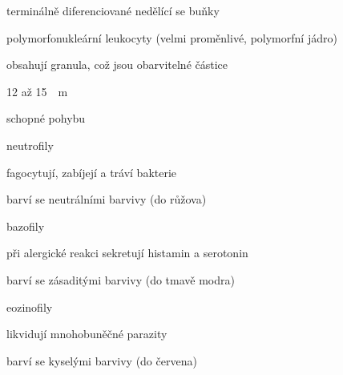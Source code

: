 \documentclass[DIV=8]{scrreprt}
\begin{document}
\begin{myItemize}[nosep]
    \item terminálně diferenciované nedělící se buňky
    \item polymorfonukleární leukocyty (velmi proměnlivé, polymorfní jádro)
    \item obsahují granula, což jsou obarvitelné částice
    \item \si{12} až \si{15 \mu m}
    \item schopné pohybu
    \item neutrofily
\begin{myItemize}[nosep]
    \item fagocytují, zabíjejí a tráví bakterie
    \item barví se neutrálními barvivy (do růžova)
\end{myItemize}

    \item bazofily
\begin{myItemize}[nosep]
    \item při alergické reakci sekretují histamin a serotonin
    \item barví se zásaditými barvivy (do tmavě modra)
\end{myItemize}

    \item eozinofily
\begin{myItemize}[nosep]
    \item likvidují mnohobuněčné parazity
    \item barví se kyselými barvivy (do červena)
\end{myItemize}

\end{myItemize}
\end{document}
